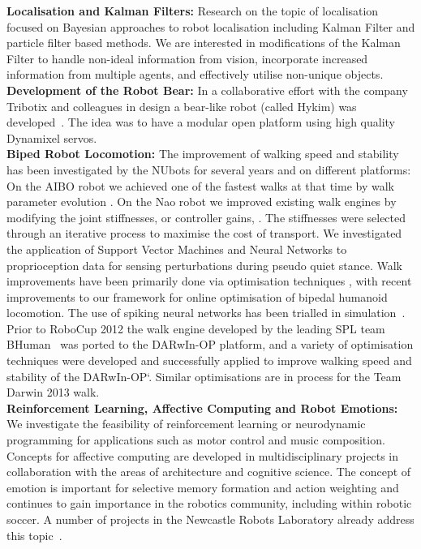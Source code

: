 \documentclass{llncs}
\begin{document}
\noindent\textbf{Localisation and Kalman Filters:} Research on the
topic of localisation focused on Bayesian approaches to robot
localisation including Kalman Filter and particle filter
based methods. We are interested in
modifications of the Kalman Filter to handle non-ideal information
from vision, incorporate increased information from multiple agents,
and effectively utilise non-unique objects.
\\

\noindent\textbf{Development of the Robot Bear:} In a collaborative
effort with the company Tribotix and colleagues in design a
bear-like robot (called Hykim) was developed~\cite{ChalupEtAl2006}. The idea was to have a modular open platform using high quality Dynamixel servos.
\\

\noindent\textbf{Biped Robot Locomotion:} The improvement of walking speed and stability has been investigated by the NUbots for several years and on different platforms: On the AIBO robot we achieved one of the fastest walks at that time by walk parameter evolution \cite{QuinlanEtAlACRA2003,ChalupEtAlSMC2007}. On the Nao robot we improved existing walk engines by modifying the joint stiffnesses, or controller gains, \cite{Kulk2008,Kulk2010,Kulk2010a}. The stiffnesses were selected through an iterative process to maximise the cost of transport. We investigated the application of Support Vector Machines and Neural Networks to proprioception data for sensing perturbations during pseudo quiet stance. Walk improvements have been primarily done via optimisation techniques \cite{Kulk2011a},  %
with recent improvements to our framework for online optimisation of bipedal humanoid locomotion.
The use of spiking neural networks has been trialled in simulation~\cite{WiklendtChalup2008}. Prior to RoboCup 2012 the walk engine developed by the leading SPL team BHuman~\cite{BHumanWalk2010} was ported to the DARwIn-OP platform, and a variety of optimisation techniques were developed and successfully applied to improve walking speed and stability of the DARwIn-OP`\cite{budden2013probabilistic}. Similar optimisations are in process for the Team Darwin 2013 walk.\\

\noindent\textbf{Reinforcement Learning, Affective Computing and Robot Emotions:} We investigate the feasibility of reinforcement learning or neurodynamic programming for applications such as motor control and music composition. Concepts for affective computing are developed in multidisciplinary projects in collaboration with the areas of architecture and cognitive science. The concept of emotion is important for selective memory formation and action weighting and continues to gain importance in the robotics community, including within robotic soccer. A number of projects in the Newcastle Robots Laboratory already address this topic~\cite{Pareidolia2010,HongEtAl2013a,HongEtAl2013b,WongEtAl2013}.
\\
\end{document}
